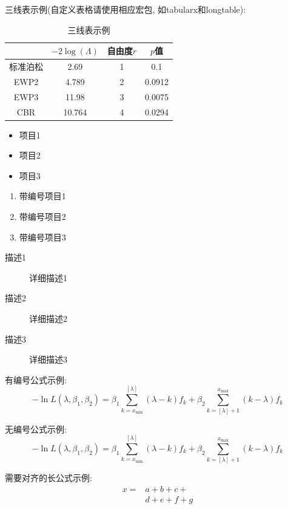 \documentclass{cosbook}
\begin{document}
三线表示例(自定义表格请使用相应宏包, 如tabularx和longtable):
\begin{table}[htbp]
  \centering
  \caption{三线表示例} \label{tab1}
    \begin{tabular}{cccc}
    \toprule
              & $-2\log(\Lambda)$ & 自由度$r$ & $p$值 \\
    \midrule
    标准泊松  & 2.69   & 1     & 0.1    \\
    EWP2      & 4.789  & 2     & 0.0912 \\
    EWP3      & 11.98  & 3     & 0.0075 \\
    CBR       & 10.764 & 4     & 0.0294 \\
    \bottomrule
    \end{tabular}
\end{table}

\begin{itemize}
  \item 项目1
  \item 项目2
  \item 项目3
\end{itemize}

\begin{enumerate}
  \item 带编号项目1
  \item 带编号项目2
  \item 带编号项目3
\end{enumerate}

\begin{description}
  \item[描述1] 详细描述1
  \item[描述2] 详细描述2
  \item[描述3] 详细描述3
\end{description}

有编号公式示例:
\begin{equation}\label{eqn_a}
  -\ln L(\lambda, \beta_1, \beta_2)=\beta_1\sum^{[\lambda]}_{k=x_{\min}}(\lambda-k) f_k+
\beta_2\sum^{x_{\max}}_{k=[\lambda]+1}(k-\lambda) f_k
\end{equation}

无编号公式示例:
\begin{equation*}\label{eqn_b}
  -\ln L(\lambda, \beta_1, \beta_2)=\beta_1\sum^{[\lambda]}_{k=x_{\min}}(\lambda-k) f_k+
\beta_2\sum^{x_{\max}}_{k=[\lambda]+1}(k-\lambda) f_k
\end{equation*}

需要对齐的长公式示例:
\[ \begin{split}
x=&a+b+c+\\
&d+e+f+g
\end{split} \]
\end{document}
